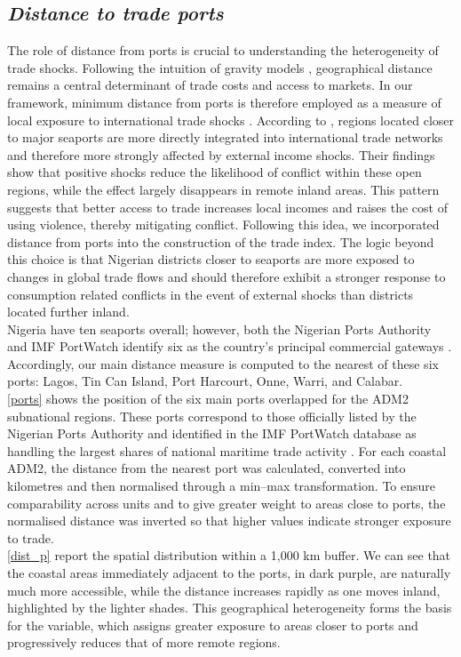 \subsection{\textit{Distance to trade ports}} 
The role of distance from ports is crucial to understanding the heterogeneity of trade shocks. Following the intuition of gravity models \textcite{anderson2003gravity}, geographical distance remains a central determinant of trade costs and access to markets. In our framework, minimum distance from ports is therefore employed as a measure of local exposure to international trade shocks \parencite{anderson2003gravity}. According to \textcite{berman2015external}, regions located closer to major seaports are more directly integrated into international trade networks and therefore more strongly affected by external income shocks. Their findings show that positive shocks reduce the likelihood of conflict within these open regions, while the effect largely disappears in remote inland areas. This pattern suggests that better access to trade increases local incomes and raises the cost of using violence, thereby mitigating conflict. 
Following this idea, we incorporated distance from ports into the construction of the trade index. The logic beyond this choice is that Nigerian districts closer to seaports are more exposed to changes in global trade flows and should therefore exhibit a stronger response to consumption related conflicts in the event of external shocks than districts located further inland. \\
Nigeria have ten seaports overall; however, both the Nigerian Ports Authority and IMF PortWatch identify six as the country’s principal commercial gateways \parencite{npaports2025, imfportwatch2025}. Accordingly, our main distance measure is computed to the nearest of these six ports: Lagos, Tin Can Island, Port Harcourt, Onne, Warri, and Calabar.\\ 

\autoref{ports} shows the position of the six main ports overlapped for the ADM2 subnational regions. These ports correspond to those officially listed by the Nigerian Ports Authority and identified in the IMF PortWatch database as handling the largest shares of national maritime trade activity \parencite{imfportwatch2025}.
For each coastal ADM2, the distance from the nearest port was calculated, converted into kilometres and then normalised through a min–max transformation. To ensure comparability across units and to give greater weight to areas close to ports, the normalised distance was inverted so that higher values indicate stronger exposure to trade.\\
\autoref{dist_p} report the spatial distribution within a 1,000 km buffer. We can see that the coastal areas immediately adjacent to the ports, in dark purple, are naturally much more accessible, while the distance increases rapidly as one moves inland, highlighted by the lighter shades. This geographical heterogeneity forms the basis for the variable, which assigns greater exposure to areas closer to ports and progressively reduces that of more remote regions. 

